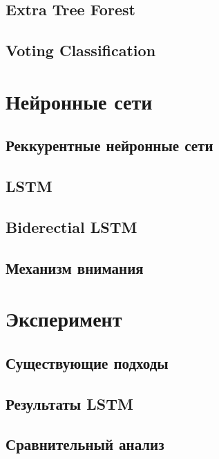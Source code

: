     \subsection{Extra Tree Forest}
    \subsection{Voting Classification}
\clearpage

\section{Нейронные сети}
    \subsection{Реккурентные нейронные сети}
    \subsection{LSTM}
    \subsection{Biderectial LSTM}
    \subsection{Механизм внимания}
\clearpage

\section{Эксперимент}
    \subsection{Существующие подходы}
    \subsection{Результаты LSTM}
    \subsection{Сравнительный анализ}
\clearpage